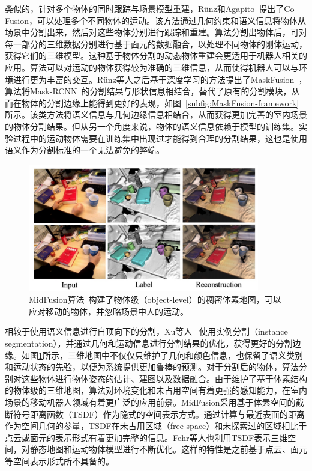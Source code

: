 类似的，针对多个物体的同时跟踪与场景模型重建，R\"unz和Agapito~\cite{2017CoFusion}提出了Co-Fusion，可以处理多个不同物体的运动。该方法通过几何约束和语义信息将物体从场景中分割出来，然后对这些物体分别进行跟踪和重建。算法分割出物体后，可对每一部分的三维数据分别进行基于面元的数据融合，以处理不同物体的刚体运动，获得它们的三维模型。这种基于物体分割的动态物体重建会更适用于机器人相关的应用。算法可以对运动的物体获得较为准确的三维信息，从而使得机器人可以与环境进行更为丰富的交互。R\"unz等人之后基于深度学习的方法提出了MaskFusion~\cite{2018MaskFusion}，算法将Mask-RCNN~\cite{2017MaskRCNN}的分割结果与形状信息相结合，替代了原有的分割模块，从而在物体的分割边缘上能得到更好的表现，如图~\ref{subfig:MaskFusion-framework}所示。该类方法将语义信息与几何边缘信息相结合，从而获得更加完善的室内场景的物体分割结果。但从另一个角度来说，物体的语义信息依赖于模型的训练集。实验过程中的运动物体需要在训练集中出现过才能得到合理的分割结果，这也是使用语义作为分割标准的一个无法避免的弊端。

\begin{figure}[thbp]
	\centering
	\includegraphics[width=0.9\textwidth]{figs/2-2/midFusion.jpeg} 
	\caption{MidFusion算法~\cite{2019MIDFusion}构建了物体级（object-level）的稠密体素地图，可以应对移动的物体，并忽略场景中人的运动。}
	\label{fig:midFusion}
\end{figure}

相较于使用语义信息进行自顶向下的分割，Xu等人 ~\cite{2019MIDFusion}使用实例分割（instance segmentation），并通过几何和运动信息进行分割结果的优化，获得更好的分割边缘。如图\ref{fig:midFusion}所示，三维地图中不仅仅只维护了几何和颜色信息，也保留了语义类别和运动状态的先验，以便为系统提供更加鲁棒的预测。对于分割后的物体，算法分别对这些物体进行物体姿态的估计、建图以及数据融合。由于维护了基于体素结构的物体级的三维地图，算法对环境变化和未占用空间有着更强的感知能力，在室内场景的移动机器人领域有着更广泛的应用前景。MidFusion采用基于体素空间的截断符号距离函数（TSDF）作为隐式的空间表示方式。通过计算与最近表面的距离作为空间几何的参量，TSDF在未占用区域（free space）和未探索过的区域相比于点云或面元的表示形式有着更加完整的信息。Fehr等人\cite{Fehr2017TSDF}也利用TSDF表示三维空间，对静态地图和运动物体模型进行不断优化。这样的特性是之前基于点云、面元等空间表示形式所不具备的。



